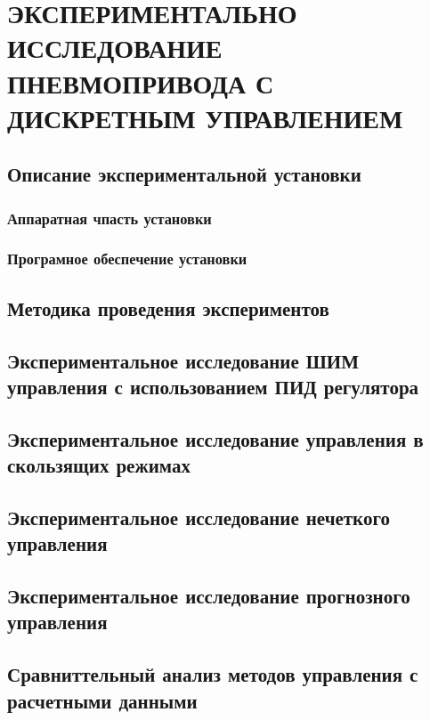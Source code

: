 \chapter{ЭКСПЕРИМЕНТАЛЬНО ИССЛЕДОВАНИЕ ПНЕВМОПРИВОДА С ДИСКРЕТНЫМ УПРАВЛЕНИЕМ}\label{ch:ch5}

\section{Описание экспериментальной установки}\label{sec:ch5/sec1}

\subsection{Аппаратная чпасть установки}\label{sec:ch5/sec1/subsec1}

\subsection{Програмное обеспечение установки}\label{sec:ch5/sec1/subsec2}

\section{Методика проведения экспериментов}\label{sec:ch5/sec2}

\section{Экспериментальное исследование ШИМ управления с использованием ПИД регулятора}\label{sec:ch5/sec3}
\section{Экспериментальное исследование управления в скользящих режимах}\label{sec:ch5/sec4}
\section{Экспериментальное исследование нечеткого управления}\label{sec:ch5/sec5}
\section{Экспериментальное исследование прогнозного управления}\label{sec:ch5/sec6}
\section{Сравниттельный анализ методов управления с расчетными данными}\label{sec:ch5/sec7}
